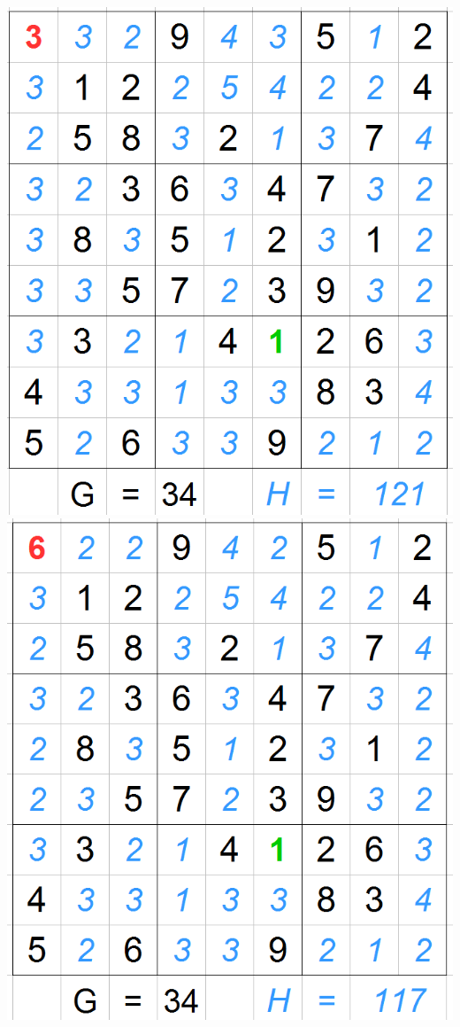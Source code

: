 \begin{center}
\includegraphics[scale=0.3]{images/AStarExample/2_1.png}
\includegraphics[scale=0.3]{images/AStarExample/2_2.png}



\end{center}

